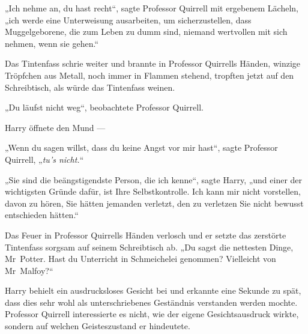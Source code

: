„Ich nehme an, du hast recht“, sagte Professor Quirrell mit ergebenem Lächeln, „ich werde eine Unterweisung ausarbeiten, um sicherzustellen, dass Muggelgeborene, die zum Leben zu dumm sind, niemand wertvollen mit sich nehmen, wenn sie gehen.“

Das Tintenfass schrie weiter und brannte in Professor Quirrells Händen, winzige Tröpfchen aus Metall, noch immer in Flammen stehend, tropften jetzt auf den Schreibtisch, als würde das Tintenfass weinen.

„Du läufst nicht weg“, beobachtete Professor Quirrell.

Harry öffnete den Mund —

„Wenn du sagen willst, dass du keine Angst vor mir hast“, sagte Professor Quirrell,
„\emph{tu’s nicht.}“

„Sie sind die beängstigendste Person, die ich kenne“, sagte Harry, „und einer der wichtigsten Gründe dafür, ist Ihre Selbstkontrolle. Ich kann mir nicht vorstellen, davon zu hören, Sie hätten jemanden verletzt, den zu verletzen Sie nicht bewusst entschieden hätten.“

Das Feuer in Professor Quirrells Händen verlosch und er setzte das zerstörte Tintenfass sorgsam auf seinem Schreibtisch ab.
„Du sagst die nettesten Dinge, Mr~Potter. Hast du Unterricht in Schmeichelei genommen? Vielleicht von Mr~Malfoy?“

Harry behielt ein ausdrucksloses Gesicht bei und erkannte eine Sekunde zu spät, dass dies sehr wohl als unterschriebenes Geständnis verstanden werden mochte. Professor Quirrell interessierte es nicht, wie der eigene Gesichtsausdruck wirkte, sondern auf welchen Geisteszustand er hindeutete.

